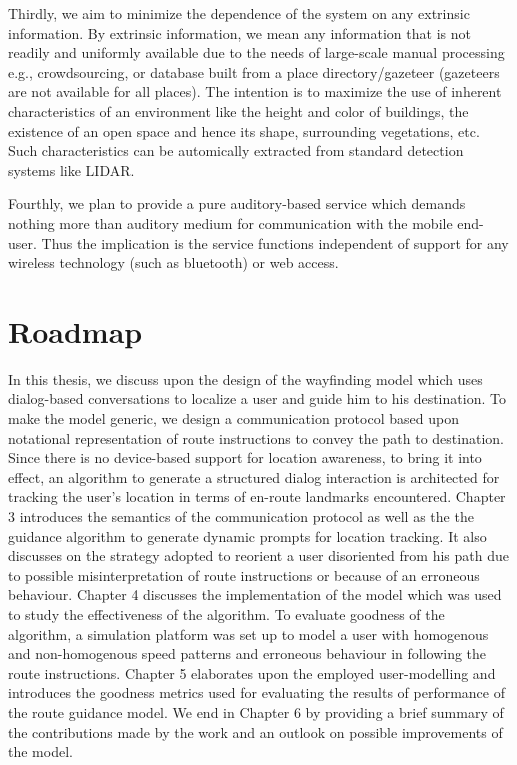 \documentclass{iitkthesis}
\begin{document}
Thirdly, we aim to minimize the dependence of the system on any extrinsic information. By extrinsic information, we mean any information that is not readily and uniformly available due to the needs of large-scale manual processing e.g., crowdsourcing, or database built from a place directory/gazeteer (gazeteers are not available for all places). The intention is to maximize the use of inherent characteristics of an environment like the height and color of buildings, the existence of an open space and hence its shape, surrounding vegetations, etc. Such characteristics can be automically extracted from standard detection systems like LIDAR.

Fourthly, we plan to provide a pure auditory-based service which demands nothing more than auditory medium for communication with the mobile end-user. Thus the implication is the service functions independent of support for any wireless technology (such as bluetooth) or web access.
  \section{Roadmap}
  In this thesis, we discuss upon the design of the wayfinding model which uses dialog-based conversations to localize a user and guide him to his destination. To make the model generic, we design a communication protocol based upon notational representation of route instructions to convey the path to destination. Since there is no device-based support for location awareness, to bring it into effect, an algorithm to generate a structured dialog interaction is architected for tracking the user's location in terms of en-route landmarks encountered. Chapter 3 introduces the semantics of the communication protocol as well as the the guidance algorithm to generate dynamic prompts for location tracking. It also discusses on the strategy adopted to reorient a user disoriented from his path due to possible misinterpretation of route instructions or because of an erroneous behaviour. Chapter 4 discusses the implementation of the model which was used to study the effectiveness of the algorithm. To evaluate goodness of the algorithm, a simulation platform was set up to model a user with homogenous and non-homogenous speed patterns and erroneous behaviour in following the route instructions. Chapter 5 elaborates upon the employed user-modelling and introduces the goodness metrics used for evaluating the results of performance of the route guidance model. We end in Chapter 6 by providing a brief summary of the contributions made by the work and an outlook on possible improvements of the model.
\end{document}
